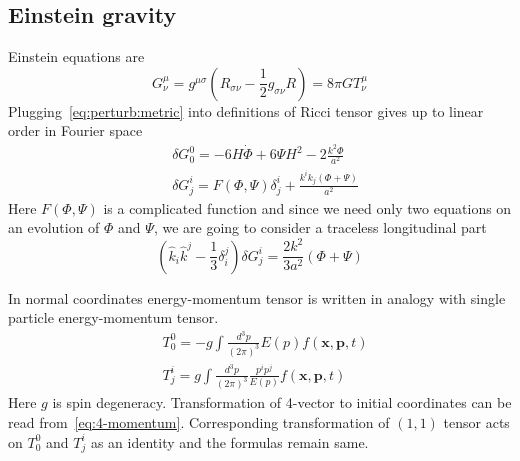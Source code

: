 \documentclass[12pt]{extarticle}
\numberwithin{problem}{section}
\numberwithin{theorem}{section}
\begin{document}
	\subsection{Einstein gravity}
	Einstein equations are
	\begin{equation}
		G^\mu_\nu = g^{\mu\sigma}\left(R_{\sigma\nu} - \frac{1}{2}g_{\sigma\nu}R\right) = 8\pi GT^\mu_\nu
	\end{equation}
	Plugging~\ref{eq:perturb:metric} into definitions of Ricci tensor gives up to linear order in Fourier space
	\begin{align}
		& \delta G^0_0 = -6H\dot{\Phi} + 6\Psi H^2 - 2\frac{k^2\Phi}{a^2} \\
		& \delta G^i_j = F(\Phi, \Psi)\delta^i_j + \frac{k^ik_j(\Phi + \Psi)}{a^2}
	\end{align}
	Here $F(\Phi, \Psi)$ is a complicated function and since we need only two equations on an evolution of $\Phi$ and $\Psi$, we are going to consider a traceless longitudinal part
	\begin{equation}
		(\hat{k}_i\hat{k}^j - \frac{1}{3}\delta_i^j)\delta G^i_j = \frac{2k^2}{3a^2}(\Phi + \Psi)
	\end{equation}
	
	In normal coordinates energy-momentum tensor is written in analogy with single particle energy-momentum tensor.
	\begin{align}
		& T^0_0 = -g\int \frac{d^3p}{(2\pi)^3} E(p) f(\mathbf{x}, \mathbf{p}, t) \\
		& T^i_j = g\int \frac{d^3p}{(2\pi)^3} \frac{p^ip^j}{E(p)} f(\mathbf{x}, \mathbf{p}, t)
	\end{align}
	Here $g$ is spin degeneracy. Transformation of 4-vector to initial coordinates can be read from~\ref{eq:4-momentum}. Corresponding transformation of $(1, 1)$ tensor acts on $T^0_0$ and $T^i_j$ as an identity and the formulas remain same.
	
\end{document}
